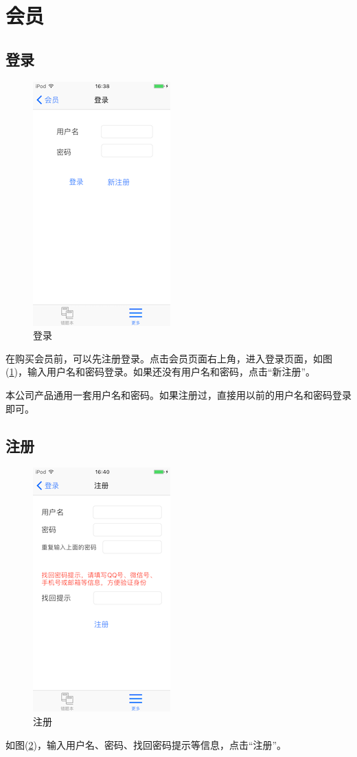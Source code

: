 \section{会员}

\subsection{登录}
\begin{figure}[H]
	\centering
	\includegraphics{img/27.png}
	\caption{登录}
	\label{img27}
\end{figure}
在购买会员前，可以先注册登录。点击会员页面右上角，进入登录页面，如图(\ref{img27})，输入用户名和密码登录。如果还没有用户名和密码，点击“新注册”。

本公司产品通用一套用户名和密码。如果注册过，直接用以前的用户名和密码登录即可。

\subsection{注册}
\begin{figure}[H]
	\centering
	\includegraphics{img/28.png}
	\caption{注册}
	\label{img28}
\end{figure}
如图(\ref{img28})，输入用户名、密码、找回密码提示等信息，点击“注册”。

